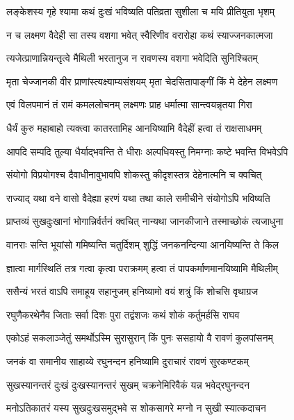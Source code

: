 \twolineshloka
{लङ्केशस्य गृहे श्यामा कथं दुःखं भविष्यति}
{पतिव्रता सुशीला च मयि प्रीतियुता भृशम्}%

\twolineshloka
{न च लक्ष्मण वैदेही सा तस्य वशगा भवेत्}
{स्वैरिणीव वरारोहा कथं स्याज्जनकात्मजा}%

\twolineshloka
{त्यजेत्प्राणान्नियन्तृत्वे मैथिली भरतानुज}
{न रावणस्य वशगा भवेदिति सुनिश्चितम्}%

\twolineshloka
{मृता चेज्जानकी वीर प्राणांस्त्यक्ष्याम्यसंशयम्}
{मृता चेदसितापाङ्गीं किं मे देहेन लक्ष्मण}%

\twolineshloka
{एवं विलपमानं तं रामं कमललोचनम्}
{लक्ष्मणः प्राह धर्मात्मा सान्त्वयन्नृतया गिरा}%

\twolineshloka
{धैर्यं कुरु महाबाहो त्यक्त्वा कातरतामिह}
{आनयिष्यामि वैदेहीं हत्वा तं राक्षसाधमम्}%

\twolineshloka
{आपदि सम्पदि तुल्या धैर्याद्‌भवन्ति ते धीराः}
{अल्पधियस्तु निमग्नाः कष्टे भवन्ति विभवेऽपि}%

\twolineshloka
{संयोगो विप्रयोगश्च दैवाधीनावुभावपि}
{शोकस्तु कीदृशस्तत्र देहेनात्मनि च क्वचित्}%

\twolineshloka
{राज्याद् यथा वने वासो वैदेह्या हरणं यथा}
{तथा काले समीचीने संयोगोऽपि भविष्यति}%

\twolineshloka
{प्राप्तव्यं सुखदुःखानां भोगान्निर्वर्तनं क्वचित्}
{नान्यथा जानकीजाने तस्माच्छोकं त्यजाधुना}%

\twolineshloka
{वानराः सन्ति भूयांसो गमिष्यन्ति चतुर्दिशम्}
{शुद्धिं जनकनन्दिन्या आनयिष्यन्ति ते किल}%

\twolineshloka
{ज्ञात्वा मार्गस्थितिं तत्र गत्वा कृत्वा पराक्रमम्}
{हत्वा तं पापकर्माणमानयिष्यामि मैथिलीम्}%

\twolineshloka
{ससैन्यं भरतं वाऽपि समाहूय सहानुजम्}
{हनिष्यामो वयं शत्रुं किं शोचसि वृथाग्रज}%

\twolineshloka
{रघुणैकरथेनैव जिताः सर्वा दिशः पुरा}
{तद्वंशजः कथं शोकं कर्तुमर्हसि राघव}%

\twolineshloka
{एकोऽहं सकलाञ्जेतुं समर्थोऽस्मि सुरासुरान्}
{किं पुनः ससहायो वै रावणं कुलपांसनम्}%

\twolineshloka
{जनकं वा समानीय साहाय्ये रघुनन्दन}
{हनिष्यामि दुराचारं रावणं सुरकण्टकम्}%

\twolineshloka
{सुखस्यानन्तरं दुःखं दुःखस्यानन्तरं सुखम्}
{चक्रनेमिरिवैकं यन्न भवेद्‌रघुनन्दन}%

\twolineshloka
{मनोऽतिकातरं यस्य सुखदुःखसमुद्‌भवे}
{स शोकसागरे मग्नो न सुखी स्यात्कदाचन}%


